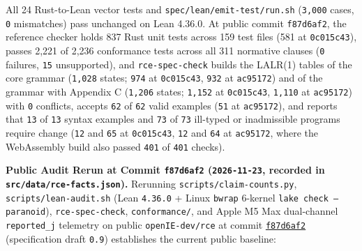 \documentclass[10pt,letterpaper]{article}
\begin{document}
All 24 Rust-to-Lean vector tests and
\texttt{spec/\allowbreak{}lean/\allowbreak{}emit-\allowbreak{}test/\allowbreak{}run.\allowbreak{}sh} (\texttt{3,000} cases,
\texttt{0} mismatches) pass unchanged on Lean 4.36.0. At public commit
\texttt{f87d6af2}, the reference checker holds 837 Rust unit tests
across 159 test files (581 at \texttt{0c015c43}), passes 2,221 of 2,236
conformance tests across all 311 normative clauses (\texttt{0} failures,
\texttt{15} unsupported), and \texttt{rce-spec-check} builds the LALR(1)
tables of the core grammar (\texttt{1,028} states; \texttt{974} at
\texttt{0c015c43}, \texttt{932} at \texttt{ac95172}) and of the grammar
with Appendix C (\texttt{1,206} states; \texttt{1,152} at
\texttt{0c015c43}, \texttt{1,110} at \texttt{ac95172}) with \texttt{0}
conflicts, accepts \texttt{62} of \texttt{62} valid examples (\texttt{51}
at \texttt{ac95172}), and reports that \texttt{13} of \texttt{13} syntax
examples and \texttt{73} of \texttt{73} ill-typed or inadmissible
programs require change (\texttt{12} and \texttt{65} at
\texttt{0c015c43}, \texttt{12} and \texttt{64} at \texttt{ac95172}, where
the WebAssembly build also passed \texttt{401} of \texttt{401} checks).

\textbf{Public Audit Rerun at Commit \texttt{f87d6af2}
(\texttt{2026-11-23}, recorded in \texttt{src/\allowbreak{}data/\allowbreak{}rce-\allowbreak{}facts.\allowbreak{}json}).}
Rerunning \texttt{scripts/\allowbreak{}claim-\allowbreak{}counts.\allowbreak{}py},
\texttt{scripts/\allowbreak{}lean-\allowbreak{}audit.\allowbreak{}sh} (Lean \texttt{4.36.0} + Linux \texttt{bwrap} 6-kernel \texttt{lake\ check\ --paranoid}),
\texttt{rce-spec-check}, \texttt{conformance/}, and Apple M5 Max
dual-channel \texttt{reported\_j} telemetry on public
\texttt{openIE-dev/rce} at commit
\href{https://github.com/openIE-dev/rce/commit/f87d6af2}{\texttt{f87d6af2}}
(specification draft \texttt{0.9}) establishes the current public baseline:
\end{document}
